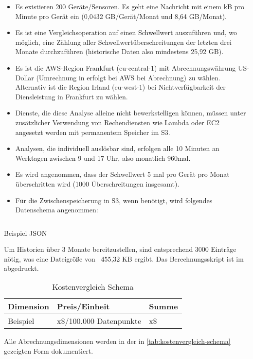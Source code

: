 \begin{itemize}
\item Es existieren 200 Geräte/Sensoren. Es geht eine Nachricht mit einem kB pro Minute pro Gerät ein (0,0432 GB/Gerät/Monat und 8,64 GB/Monat).
\item Es ist eine Vergleichsoperation auf einen Schwellwert auszuführen und, wo möglich, eine Zählung aller Schwellwertüberschreitungen der letzten drei Monate durchzuführen (historische Daten also mindestens 25,92 GB).  
\item Es ist die \ac{AWS}-Region Frankfurt (eu-central-1) mit Abrechnungswährung US-Dollar (Umrechnung in \texteuro{} erfolgt bei \ac{AWS} bei Abrechnung) zu wählen. Alternativ ist die Region Irland (eu-west-1) bei Nichtverfügbarkeit der Diensleistung in Frankfurt zu wählen. 
\item Dienste, die diese Analyse alleine nicht bewerkstelligen können, müssen unter zusätzlicher Verwendung von Rechendiensten wie Lambda oder \ac{EC2} angesetzt werden mit permanentem Speicher im \ac{S3}. 
\item Analysen, die individuell auslösbar sind, erfolgen alle 10 Minuten an Werktagen zwischen 9 und 17 Uhr, also monatlich 960mal. 
\item Es wird angenommen, dass der Schwellwert 5 mal pro Gerät pro Monat überschritten wird (1000 Überschreitungen insgesamt).
\item Für die Zwischenspeicherung in \ac{S3}, wenn benötigt, wird folgendes Datenschema angenommen:
\end{itemize}

\begin{listing}[H]
\inputminted[frame=lines,breaklines=true]{json}{code/estimates/filtered-estimate.json}
\caption[Beispiel JSON]{Beispiel \ac{JSON}}
\label{listing:json}
\end{listing}
Um Historien über 3 Monate bereitzustellen, sind entsprechend 3000 Einträge nötig, was eine Dateigröße von ~455,32 KB ergibt. Das Berechnungsskript ist im  abgedruckt.


\begin{table}[H]
\centering
\begin{tabular}{|l|l|l|}
\hline
Dimension & Preis/Einheit           & Summe \\ \hline
Beispiel  & x\$/100.000 Datenpunkte & x\$  \\\hline
\end{tabular}
\caption{Kostenvergleich Schema}
\label{tab:kostenvergleich-schema}
\end{table}
Alle Abrechnungsdimensionen werden in der in \autoref{tab:kostenvergleich-schema} gezeigten Form dokumentiert.
